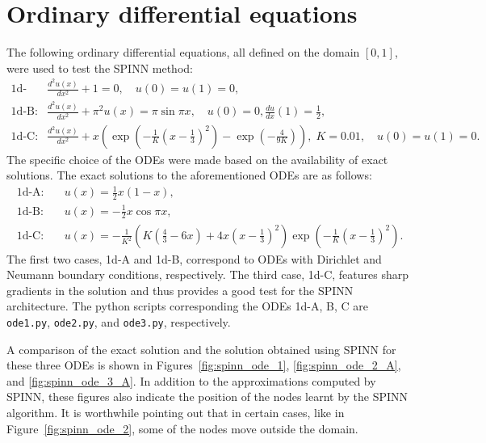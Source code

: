 \documentclass[12pt]{article}
\begin{document}
\section{Ordinary differential equations} \label{app:ode}
The following ordinary differential equations, all defined on the domain $[0,1]$, were used to test the SPINN method:
\begin{displaymath}
\begin{split}
\text{1d-A:}\quad & \frac{d^2 u(x)}{dx^2} + 1 = 0, \quad u(0) = u(1) = 0,\\
\text{1d-B:}\quad & \frac{d^2 u(x)}{dx^2} + \pi^2 u(x) = \pi \sin \pi x, \quad u(0) = 0, \frac{du}{dx}(1) = \frac{1}{2},\\
\text{1d-C:}\quad & \frac{d^2 u(x)}{dx^2} + x\left(\exp {\left(-\frac{1}{K}\left(x - \frac{1}{3}\right)^2\right)} - \exp {\left(-\frac{4}{9K}\right)}\right), \; K = 0.01, \quad u(0) = u(1) = 0.
\end{split}
\end{displaymath}
The specific choice of the ODEs were made based on the availability of exact solutions.  The exact solutions to the aforementioned ODEs are as follows:
\begin{displaymath}
\begin{split}
\text{1d-A:}\quad& u(x) = \frac{1}{2}x(1 - x),\\
\text{1d-B:}\quad& u(x) = -\frac{1}{2}x\cos \pi x,\\
\text{1d-C:}\quad& u(x) = -\frac{1}{K^2}\left(K \left(\frac{4}{3} - 6x\right) + 4x\left(x - \frac{1}{3}\right)^2\right)\exp\left(-\frac{1}{K}\left(x - \frac{1}{3}\right)^2\right).
\end{split}
\end{displaymath}
The first two cases, 1d-A and 1d-B, correspond to ODEs with Dirichlet and Neumann boundary conditions, respectively. The third case, 1d-C, features sharp gradients in the solution and thus provides a good test for the SPINN architecture. The python scripts corresponding the ODEs 1d-A, B, C are \verb|ode1.py|, \verb|ode2.py|, and \verb|ode3.py|, respectively.

A comparison of the exact solution and the solution obtained using SPINN for these three ODEs is shown in Figures~\ref{fig:spinn_ode_1}, \ref{fig:spinn_ode_2_A}, and \ref{fig:spinn_ode_3_A}. In addition to the approximations computed by SPINN, these figures also indicate the position of the nodes learnt by the SPINN algorithm. It is worthwhile pointing out that in certain cases, like in Figure~\ref{fig:spinn_ode_2}, some of the nodes move outside the domain.
\end{document}
